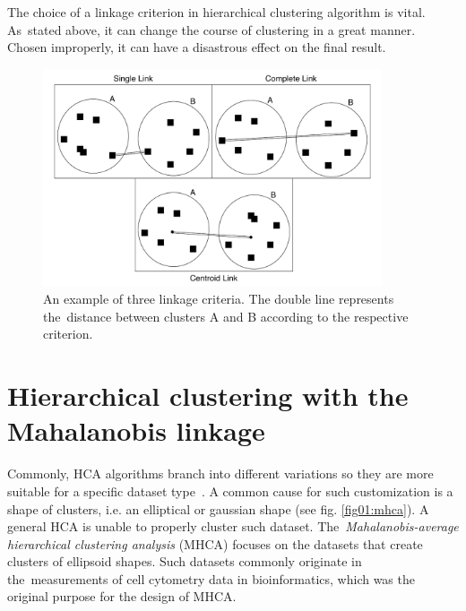 The choice of a linkage criterion in hierarchical clustering algorithm is vital. As~stated above, it can change the course of clustering in a great manner. Chosen improperly, it can have a disastrous effect on the final result.

\begin{figure}\centering
	\includegraphics[width=10cm]{img/linkage_criteria}
	\caption{An example of three linkage criteria. The double line represents the~distance between clusters A and B according to the respective criterion.}
	\label{fig01:link}
\end{figure}

\section{Hierarchical clustering with the Ma\-ha\-la\-no\-bis linkage}

Commonly, HCA algorithms branch into different variations so they are more suitable for a specific dataset type~\cite{murtagh2008hierarchical,oh2004hierarchical,zhao2005hierarchical}. A common cause for such customization is a shape of clusters, i.e. an elliptical or gaussian shape (see fig. \ref{fig01:mhca}). A general HCA is unable to properly cluster such dataset. The~\emph{Ma\-ha\-la\-no\-bis-average hierarchical clustering analysis} (MHCA) focuses on the datasets that create clusters of ellipsoid shapes. Such datasets commonly originate in the~measurements of cell cytometry data in bioinformatics, which was the original purpose for the design of MHCA.

